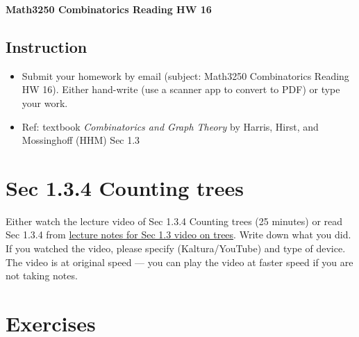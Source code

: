\documentclass[10pt]{amsart}
\begin{document}
\begin{center}\textbf{Math3250 Combinatorics Reading HW 16}\end{center}




\subsection*{Instruction}

\begin{itemize}
\item 
Submit your homework by email (subject: Math3250 Combinatorics Reading HW 16). Either hand-write (use a scanner app to convert to PDF) or type your work.
\item
Ref: textbook \emph{Combinatorics and Graph Theory} by Harris, Hirst, and Mossinghoff (HHM) Sec 1.3
\end{itemize}





\section{Sec 1.3.4 Counting trees}
Either watch the lecture video of Sec 1.3.4 Counting trees (25 minutes) or read Sec 1.3.4 from \href{https://egunawan.github.io/combinatorics/notes/notes1_3trees.pdf}{lecture notes for Sec 1.3 video on trees}. 
Write down what you did. If you watched the video, please specify (Kaltura/YouTube) and type of device. The video is at original speed --- you can play the video at faster speed if you are not taking notes.


\section{Exercises}
\end{document}
